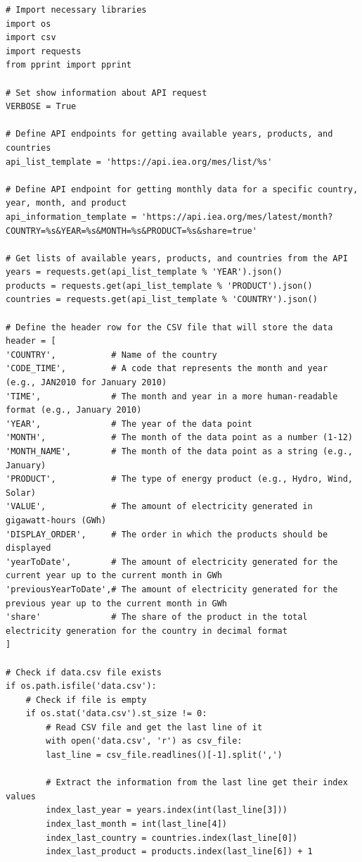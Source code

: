 \documentclass{article}
\begin{document}
\begin{verbatim}
# Import necessary libraries
import os
import csv
import requests
from pprint import pprint

# Set show information about API request
VERBOSE = True

# Define API endpoints for getting available years, products, and countries
api_list_template = 'https://api.iea.org/mes/list/%s'

# Define API endpoint for getting monthly data for a specific country, year, month, and product
api_information_template = 'https://api.iea.org/mes/latest/month?COUNTRY=%s&YEAR=%s&MONTH=%s&PRODUCT=%s&share=true'

# Get lists of available years, products, and countries from the API
years = requests.get(api_list_template % 'YEAR').json()
products = requests.get(api_list_template % 'PRODUCT').json()
countries = requests.get(api_list_template % 'COUNTRY').json()

# Define the header row for the CSV file that will store the data
header = [
'COUNTRY',           # Name of the country
'CODE_TIME',         # A code that represents the month and year (e.g., JAN2010 for January 2010)
'TIME',              # The month and year in a more human-readable format (e.g., January 2010)
'YEAR',              # The year of the data point
'MONTH',             # The month of the data point as a number (1-12)
'MONTH_NAME',        # The month of the data point as a string (e.g., January)
'PRODUCT',           # The type of energy product (e.g., Hydro, Wind, Solar)
'VALUE',             # The amount of electricity generated in gigawatt-hours (GWh)
'DISPLAY_ORDER',     # The order in which the products should be displayed
'yearToDate',        # The amount of electricity generated for the current year up to the current month in GWh
'previousYearToDate',# The amount of electricity generated for the previous year up to the current month in GWh
'share'              # The share of the product in the total electricity generation for the country in decimal format
]

# Check if data.csv file exists
if os.path.isfile('data.csv'):
	# Check if file is empty 
	if os.stat('data.csv').st_size != 0:
		# Read CSV file and get the last line of it
		with open('data.csv', 'r') as csv_file:
		last_line = csv_file.readlines()[-1].split(',')

		# Extract the information from the last line get their index values
		index_last_year = years.index(int(last_line[3]))
		index_last_month = int(last_line[4])
		index_last_country = countries.index(last_line[0])
		index_last_product = products.index(last_line[6]) + 1


\end{verbatim}
\end{document}
